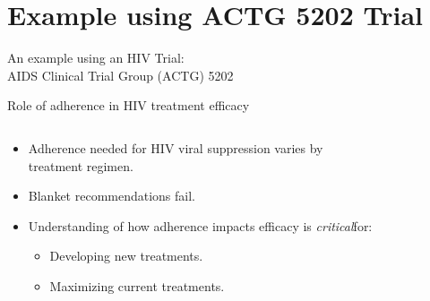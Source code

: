 \documentclass{beamer}
\begin{document}
\section{Example using ACTG 5202 Trial}

\begin{frame}
    \huge
    \centering
    An example using an HIV Trial: \\
   
    AIDS Clinical Trial Group (ACTG) 5202
\end{frame}

\begin{frame}{Role of adherence in HIV treatment efficacy}
    \begin{columns}
    \begin{column}{0.45\textwidth}
        \begin{itemize}
            \item Adherence needed for HIV viral suppression varies by treatment regimen.
            \item Blanket recommendations fail.
            \item[\ding{43}] Understanding of how adherence impacts efficacy is \textit{critical}\footnotemark[1] for:
            \begin{itemize}
                \item Developing new treatments.
                \item Maximizing current treatments.
            \end{itemize}
        \end{itemize}
    \end{column}
    \begin{column}{0.55\textwidth}
    \begin{figure}
        \centering

\end{figure}
\end{column}
\end{columns}
\end{frame}
\end{document}
